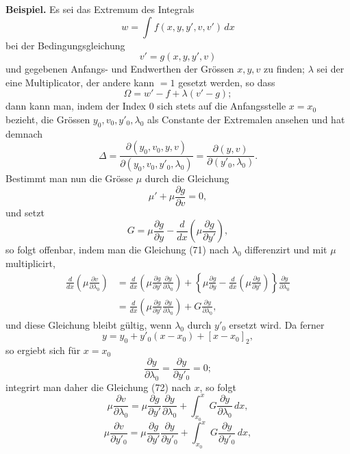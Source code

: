 \documentclass[11pt,a4paper,leqno]{article}
\begin{document}
\noindent\textbf{Beispiel.} Es sei das Extremum des Integrals
\[
w=\int f(x,y,y',v,v')\,dx
\]
bei der Bedingungsgleichung
\begin{equation}\tag{71}
v'=g(x,y,y',v)
\end{equation}
und gegebenen Anfangs- und Endwerthen der Grössen $x,y,v$
zu finden; $\lambda$ sei der eine Multiplicator, der andere kann $=1$
gesetzt werden, so dass
\[
\Omega=w'-f+\lambda(v'-g);
\]
dann kann man, indem der Index 0 sich stets auf die Anfangsstelle
$x=x_0$ bezieht, die Grössen $y_0,v_0,y'_0,\lambda_0$ als Constante
der Extremalen ansehen und hat demnach
\[
\Delta=
\frac{\partial(y_0,v_0,y,v)}{\partial(y_0,v_0,y'_0,\lambda_0)}
=\frac{\partial(y,v)}{\partial(y'_0,\lambda_0)}.
\]
Bestimmt man nun die Grösse $\mu$ durch die Gleichung
\[
\mu'+\mu\frac{\partial g}{\partial v}=0,
\]
und setzt
\[
G=\mu\frac{\partial g}{\partial y}
-\frac{d}{dx}\left(\mu\frac{\partial g}{\partial y'}\right),
\]
so folgt offenbar, indem man die Gleichung (71) nach $\lambda_0$ differenzirt
und mit $\mu$ multiplicirt,
\begin{equation}\tag{72}
\begin{aligned}
\frac{d}{dx}\left(\mu\frac{\partial v}{\partial\lambda_0}\right)
&=\frac{d}{dx}\left(\mu\frac{\partial g}{\partial y'}
\frac{\partial y}{\partial\lambda_0}\right)
+\left\{\mu\frac{\partial g}{\partial y}
-\frac{d}{dx}\left(\mu\frac{\partial g}{\partial y'}\right)\right\}
\frac{\partial y}{\partial\lambda_0}\\
&=\frac{d}{dx}\left(\mu\frac{\partial g}{\partial y'}
\frac{\partial y}{\partial\lambda_0}\right)
+G\frac{\partial y}{\partial\lambda_0},
\end{aligned}
\end{equation}
und diese Gleichung bleibt gültig, wenn $\lambda_0$ durch $y'_0$ ersetzt wird.
Da ferner
\begin{equation}\tag{73}
y=y_0+y'_0(x-x_0)+[x-x_0]_2,
\end{equation}
so ergiebt sich für $x=x_0$
\[
\frac{\partial y}{\partial\lambda_0}
=\frac{\partial y}{\partial y'_0}=0;
\]
integrirt man daher die Gleichung (72) nach $x$, so folgt
\[
\mu\frac{\partial v}{\partial\lambda_0}
=\mu\frac{\partial g}{\partial y'}\frac{\partial y}{\partial\lambda_0}
+\int_{x_0}^{x}G\frac{\partial y}{\partial\lambda_0}\,dx,
\]
\[
\mu\frac{\partial v}{\partial y'_0}
=\mu\frac{\partial g}{\partial y'}\frac{\partial y}{\partial y'_0}
+\int_{x_0}^{x}G\frac{\partial y}{\partial y'_0}\,dx,
\]
\end{document}
